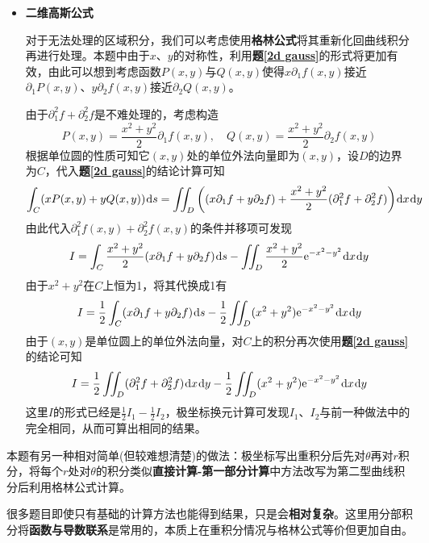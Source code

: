 \documentclass[a4paper,UTF8,fontset=windows,AutoFakeBold]{ctexart}
\newcommand*{\dr}{\hspace{0.07em}\mathrm{d}}
\newcommand*{\er}{\mathrm{e}}
\newcommand*{\note}{\noindent *}
\theoremstyle{ex}
\newcommand{\exref}[1]{\textbf{题\;\ref{#1}\;}}
\begin{document}
\begin{framed}
{\begin{itemize}
        \item \textbf{二维高斯公式}
        
        对于无法处理的区域积分，我们可以考虑使用\textbf{格林公式}将其重新化回曲线积分再进行处理。本题中由于$x$、$y$的对称性，利用\exref{2d gauss}的形式将更加有效，由此可以想到考虑函数$P(x,y)$与$Q(x,y)$使得$x\partial_1f(x,y)$接近$\partial_1P(x,y)$、$y\partial_2f(x,y)$接近$\partial_2Q(x,y)$。

        由于$\partial_1^2f+\partial_2^2f$是不难处理的，考虑构造
        $$P(x,y)=\frac{x^2+y^2}{2}\partial_1f(x,y),\quad Q(x,y)=\frac{x^2+y^2}{2}\partial_2f(x,y)$$
        根据单位圆的性质可知它$(x,y)$处的单位外法向量即为$(x,y)$，设$D$的边界为$C$，代入\exref{2d gauss}的结论计算可知
        $$\int_C(xP(x,y)+yQ(x,y))\dr s=\iint_D\bigg((x\partial_1f+y\partial_2f)+\frac{x^2+y^2}{2}(\partial_1^2f+\partial_2^2f)\bigg)\dr x\dr y$$
        由此代入$\partial_1^2f(x,y)+\partial_2^2f(x,y)$的条件并移项可发现
        $$I=\int_C\frac{x^2+y^2}{2}(x\partial_1f+y\partial_2f)\dr s-\iint_D\frac{x^2+y^2}{2}\er^{-x^2-y^2}\dr x\dr y$$
        由于$x^2+y^2$在$C$上恒为1，将其代换成1有
        $$I=\frac{1}{2}\int_C(x\partial_1f+y\partial_2f)\dr s-\frac{1}{2}\iint_D(x^2+y^2)\er^{-x^2-y^2}\dr x\dr y$$
        由于$(x,y)$是单位圆上的单位外法向量，对$C$上的积分再次使用\exref{2d gauss}的结论可知
        $$I=\frac{1}{2}\iint_D(\partial_1^2f+\partial_2^2f)\dr x\dr y-\frac{1}{2}\iint_D(x^2+y^2)\er^{-x^2-y^2}\dr x\dr y$$
        这里$I$的形式已经是$\frac{1}{2}I_1-\frac{1}{2}I_2$，极坐标换元计算可发现$I_1$、$I_2$与前一种做法中的完全相同，从而可算出相同的结果。
    \end{itemize}

    \note 本题有另一种相对简单(但较难想清楚)的做法：极坐标写出重积分后先对$\theta$再对$r$积分，将每个$r$处对$\theta$的积分类似\textbf{直接计算-第一部分计算}中方法改写为第二型曲线积分后利用格林公式计算。
}
\end{framed}

\note 很多题目即使只有基础的计算方法也能得到结果，只是会\textbf{相对复杂}。这里用分部积分将\textbf{函数与导数联系}是常用的，本质上在重积分情况与格林公式等价但更加自由。
\end{document}

